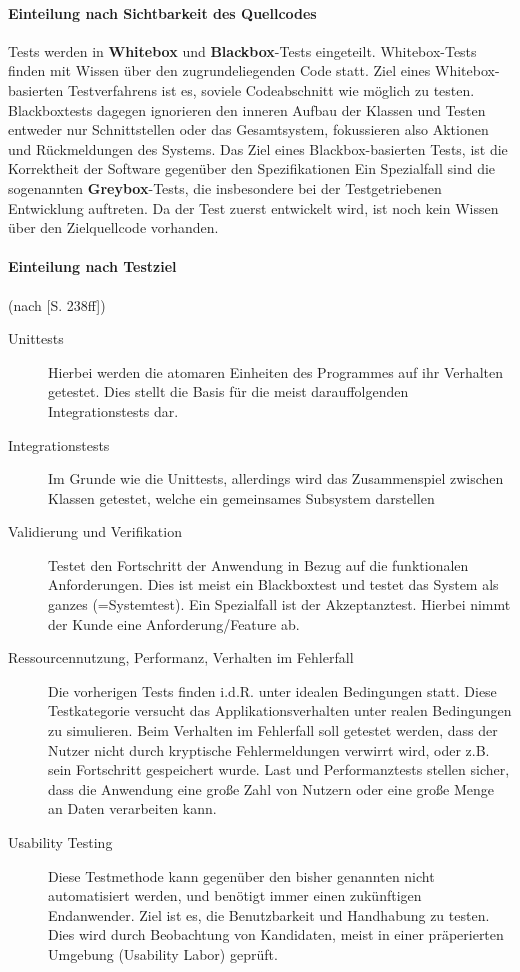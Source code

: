 \paragraph{Einteilung nach Sichtbarkeit des Quellcodes} Tests werden in \textbf{Whitebox} und \textbf{Blackbox}-Tests eingeteilt. 
Whitebox-Tests finden mit Wissen über den zugrundeliegenden Code statt. Ziel eines Whitebox-basierten Testverfahrens ist es, soviele Codeabschnitt wie möglich zu testen. Blackboxtests dagegen ignorieren den inneren Aufbau der Klassen und Testen entweder nur Schnittstellen oder das Gesamtsystem, fokussieren also Aktionen und Rückmeldungen des Systems. Das Ziel eines Blackbox-basierten Tests, ist die Korrektheit der Software gegenüber den Spezifikationen
Ein Spezialfall sind die sogenannten \textbf{Greybox}-Tests, die insbesondere bei der Testgetriebenen Entwicklung auftreten. Da der Test zuerst entwickelt wird, ist noch kein Wissen über den Zielquellcode vorhanden.

\paragraph{Einteilung nach Testziel} (nach \cite{hunt_pragmatic_1999}[S. 238ff])
\begin{description}
 \item[Unittests] Hierbei werden die atomaren Einheiten des Programmes auf ihr Verhalten getestet. Dies stellt die Basis für die meist darauffolgenden Integrationstests dar.
 \item[Integrationstests] Im Grunde wie die Unittests, allerdings wird das Zusammenspiel zwischen Klassen getestet, welche ein gemeinsames Subsystem darstellen
 \item[Validierung und Verifikation] Testet den Fortschritt der Anwendung in Bezug auf die funktionalen Anforderungen. Dies ist meist ein Blackboxtest und testet das System als ganzes (=Systemtest). Ein Spezialfall ist der Akzeptanztest. Hierbei nimmt der Kunde eine Anforderung/Feature ab.
 \item[Ressourcennutzung, Performanz, Verhalten im Fehlerfall] Die vorherigen Tests finden i.d.R. unter idealen Bedingungen statt. Diese Testkategorie versucht das Applikationsverhalten unter realen Bedingungen zu simulieren. Beim Verhalten im Fehlerfall soll getestet werden, dass der Nutzer nicht durch kryptische Fehlermeldungen verwirrt wird, oder z.B. sein Fortschritt gespeichert wurde. Last und Performanztests stellen sicher, dass die Anwendung eine große Zahl von Nutzern oder eine große Menge an Daten verarbeiten kann.
 \item[Usability Testing] Diese Testmethode kann gegenüber den bisher genannten nicht automatisiert werden, und benötigt immer einen zukünftigen Endanwender. Ziel ist es, die Benutzbarkeit und Handhabung zu testen. Dies wird durch Beobachtung von Kandidaten, meist in einer präperierten Umgebung (Usability Labor) geprüft.
\end{description}


